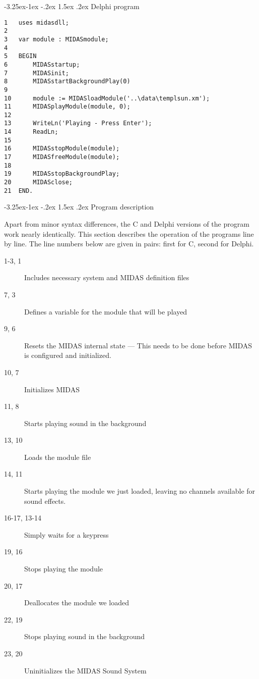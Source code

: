 \documentclass[a4paper,12pt,oneside]{book}
\makeatletter
\renewcommand\subsection{\@startsection{subsection}{2}{-20pt}%
                                     {-3.25ex\@plus -1ex \@minus -.2ex}%
                                     {1.5ex \@plus .2ex}%
                                     {\normalfont\large\bfseries}}
\makeatother
\begin{document}
\subsection{Delphi program}

\begin{verbatim}
1   uses midasdll;
2
3   var module : MIDASmodule;
4
5   BEGIN
6       MIDASstartup;
7       MIDASinit;
8       MIDASstartBackgroundPlay(0)
9
10      module := MIDASloadModule('..\data\templsun.xm');
11      MIDASplayModule(module, 0);
12
13      WriteLn('Playing - Press Enter');
14      ReadLn;
15
16      MIDASstopModule(module);
17      MIDASfreeModule(module);
18
19      MIDASstopBackgroundPlay;
20      MIDASclose;
21  END.
\end{verbatim}


\subsection{Program description}

Apart from minor syntax differences, the C and Delphi versions of the program
work nearly identically. This section describes the operation of the programs
line by line. The line numbers below are given in pairs: first for C, second
for Delphi.

\begin{description}
    \item [1-3, 1] Includes necessary system and MIDAS definition files
    \item [7, 3] Defines a variable for the module that will be played
    \item [9, 6] Resets the MIDAS internal state --- This needs to be done
        before MIDAS is configured and initialized.
    \item [10, 7] Initializes MIDAS
    \item [11, 8] Starts playing sound in the background
    \item [13, 10] Loads the module file
    \item [14, 11] Starts playing the module we just loaded, leaving no
        channels available for sound effects.
    \item [16-17, 13-14] Simply waits for a keypress
    \item [19, 16] Stops playing the module
    \item [20, 17] Deallocates the module we loaded
    \item [22, 19] Stops playing sound in the background
    \item [23, 20] Uninitializes the MIDAS Sound System
\end{description}
\end{document}
